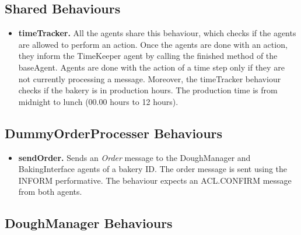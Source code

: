 \documentclass[paper=a4, fontsize=11pt]{scrartcl}
\begin{document}
	\subsection*{Shared Behaviours}
	
	\begin{itemize}
		\item \textbf{timeTracker.} All the agents share this behaviour, which checks if the agents are allowed to perform an action. Once the agents are done with an action, they inform the TimeKeeper agent by calling the finished method of the baseAgent. Agents are done with the action of a time step only if they are not currently processing a message. Moreover, the timeTracker behaviour checks if the bakery is in production hours. The production time is from midnight to lunch (00.00 hours to 12 hours). 
		
	\end{itemize}
	
	\subsection*{DummyOrderProcesser Behaviours}
	
	\begin{itemize}
		
		\item \textbf{sendOrder.} Sends an \textit{Order} message to the DoughManager and BakingInterface agents of a bakery ID. The order message is sent using the INFORM performative. The behaviour expects an ACL.CONFIRM message from both agents. 
		
	\end{itemize}
	
	\subsection*{DoughManager Behaviours}
	
\end{document}
